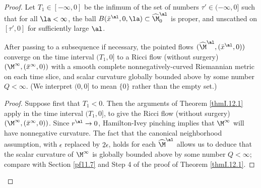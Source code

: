 \begin{proof}
Let $T_1 \in [-\infty,0]$ be the infimum of the set of numbers
$\tau'\in (-\infty,0]$ such that for all $\la<\infty$,
the ball $B(\bar x^\al,0,\la)\subset\widehat\M^\al_0$
is proper,
and unscathed on $[\tau',0]$ for sufficiently
large $\al$.

\begin{lemma}
  \label{lem:kl-construction-ricci-flow-surgery-convergence-ricci-flow-surgery}
 \label{bdrysmoothness}
After passing to a subsequence
if necessary, the pointed flows  $(\widehat\M^\al,(\bar x^\al,0))$
converge on the time interval $(T_1, 0]$ to a Ricci flow (without
surgery) $(\M^\infty,(\bar x^\infty,0))$ with
a smooth complete nonnegatively-curved Riemannian metric
on each time slice, and
scalar curvature globally bounded above by
some number $Q<\infty$.
(We interpret $(0, 0]$ to mean $\{0\}$ rather than the
empty set.)
\end{lemma}
\begin{proof}
Suppose first that $T_1 < 0$.
Then the arguments of Theorem \ref{thmI.12.1} apply in the
time interval $(T_1, 0]$, to give the Ricci flow (without
surgery) $(\M^\infty,(\bar x^\infty,0))$.
Since $r^{\al} \rightarrow 0$, Hamilton-Ivey pinching
implies that $\M^\infty$ will have nonnegative curvature.
The fact that the
canonical neighborhood assumption,
with $\epsilon$ replaced by $2 \epsilon$,
holds for each $\widehat\M^\al$ allows us
to deduce
that the scalar curvature of $\M^\infty$ is globally bounded above by
some number $Q<\infty$; compare with Section \ref{pf11.7}
and Step 4 of the proof of Theorem \ref{thmI.12.1}.


\end{proof}
\end{proof}
